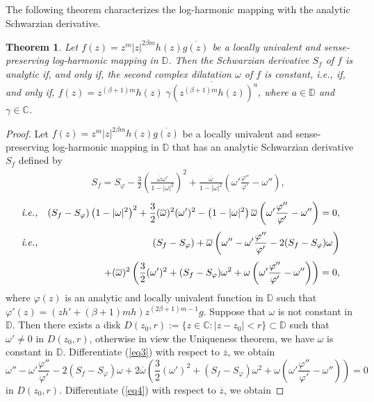 \documentclass[12pt,reqno]{amsart}
\newtheorem{thm}{Theorem}[section]
\newtheorem{open problem}{Open problem}[section]
\newcommand{\ol}{\overline}
\newcommand{\be}{\begin{equation}}
\newcommand{\ee}{\end{equation}}
\newcommand{\beas}{\begin{eqnarray*}}
\newcommand{\eeas}{\end{eqnarray*}}
\newcommand{\bea}{\begin{eqnarray}}
\newcommand{\eea}{\end{eqnarray}}
\renewcommand{\phi}{\varphi}
\numberwithin{equation}{section}
\begin{document}
The following theorem characterizes the log-harmonic mapping with the analytic Schwarzian derivative.
\begin{thm}\label{Theo3}
Let $f(z)=z^m|z|^{2\beta m} h(z)\ol{g(z)}$ be a locally univalent and sense-preserving log-harmonic mapping in $\mathbb{D}$. Then the Schwarzian derivative $S_f$ of $f$ is analytic if, 
and only if, the second complex dilatation $\omega$ of $f$ is constant, {\it i.e.}, if, and only if, $f(z)=z^{(\beta+1) m} h(z)\;\ol{\gamma\left(z^{(\beta+1) m} h(z)\right)^a}$, where 
$a\in\mathbb{D}$ and $\gamma\in\mathbb{C}$. 
\end{thm}
\begin{proof} 
Let $f(z)=z^m|z|^{2\beta m} h(z)\ol{g(z)}$ be a locally univalent and sense-preserving log-harmonic mapping in $\mathbb{D}$ that has an analytic Schwarzian derivative $S_f$ defined by 
\beas &&S_f=S_\phi-\frac{3}{2}\left(\frac{\ol{\omega}\omega'}{1-|\omega|^2}\right)^2+\frac{\ol{\omega}}{1-|\omega|^2}\left(\omega' \frac{\phi''}{\phi'}-\omega''\right), \eeas
\bea\text{\it i.e.,}&&(S_f- S_\phi)\left(1-|\omega|^2\right)^2+ \frac{3}{2}(\ol{\omega})^2(\omega')^2-\left(1-|\omega|^2\right)\ol{\omega}\left(\omega' \frac{\phi''}{\phi'}-\omega''\right)=0,\nonumber\\[1mm]\text{\it i.e.,}
&&\quad(S_f- S_\phi)+\ol{\omega}\left(\omega''-\omega' \frac{\phi''}{\phi'}-2(S_f- S_\phi)\omega\right)\nonumber\\[1mm]
\label{eq3}&&+(\ol{\omega})^2\left( \frac{3}{2}(\omega')^2+(S_f- S_\phi)\omega^2+\omega\left(\omega' \frac{\phi''}{\phi'}-\omega''\right)\right)=0,\eea
where $\phi(z)$ is an analytic and locally univalent function in $\mathbb{D}$ such that $\phi'(z)=(zh'+(\beta+1)m h)z^{(2\beta+1)m-1}g$. Suppose that $\omega$ is not constant in $\mathbb{D}$. Then there exists a disk $D(z_0, r):=\{z\in\mathbb{C}: |z-z_0|<r\}\subset \mathbb{D}$ such that $\omega'\not=0$ in $D(z_0, r)$, otherwise in view the Uniqueness theorem, we have $\omega$ is constant in $\mathbb{D}$. Differentiate (\ref{eq3}) with respect to $\ol{z}$, we obtain
\be\label{eq4}
\omega''-\omega' \frac{\phi''}{\phi'}-2(S_f- S_\phi)\omega+2\ol{\omega}\left( \frac{3}{2}(\omega')^2+(S_f- S_\phi)\omega^2+\omega\left(\omega' \frac{\phi''}{\phi'}-\omega''\right)\right)=0\ee
in $D(z_0,r)$. Differentiate (\ref{eq4}) with respect to $\ol{z}$, we obtain

\end{proof}
\end{document}
